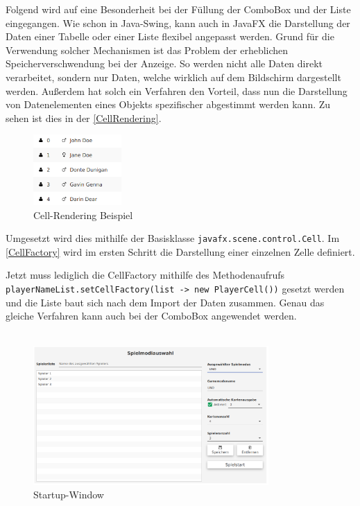 Folgend wird auf eine Besonderheit bei der Füllung der ComboBox und der Liste eingegangen.
Wie schon in Java-Swing, kann auch in JavaFX die Darstellung der Daten einer Tabelle oder einer Liste flexibel angepasst werden.
Grund für die Verwendung solcher Mechanismen ist das Problem der erheblichen Speicherverschwendung bei der Anzeige.
So werden nicht alle Daten direkt verarbeitet, sondern nur Daten, welche wirklich auf dem Bildschirm dargestellt werden.
Außerdem hat solch ein Verfahren den Vorteil, dass nun die Darstellung von Datenelementen eines Objekts spezifischer abgestimmt werden kann.
Zu sehen ist dies in der \autoref{CellRendering}.
\begin{figure}[H]
\centering
\includegraphics[width=0.3\textwidth]{fig/ainf/CellRendering}
\caption{Cell-Rendering Beispiel}
\label{CellRendering}
\end{figure}
Umgesetzt wird dies mithilfe der Basisklasse \lstinline[style=java]{javafx.scene.control.Cell}.
Im \autoref{CellFactory} wird im ersten Schritt die Darstellung einer einzelnen Zelle definiert.

Jetzt muss lediglich die CellFactory mithilfe des Methodenaufrufs \lstinline[style=java]{playerNameList.setCellFactory(list -> new PlayerCell())} gesetzt werden und die Liste baut sich nach dem Import der Daten zusammen.
Genau das gleiche Verfahren kann auch bei der ComboBox angewendet werden.\\\\
\begin{figure}[H]
\centering
\vspace{-10mm}
\includegraphics[width=0.8\textwidth]{fig/ainf/Startup_German.png}
\caption{Startup-Window}
\label{startupWindow}
\end{figure}

